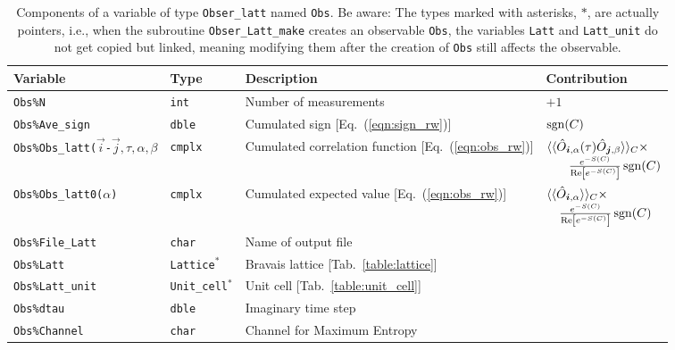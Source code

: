 \begin{table}[h!]
	\begin{center}
	\begin{tabular}{@{} p{}  l  p{} p{} @{}}\toprule
		Variable  &  Type      &  Description &  Contribution \\\midrule
		\texttt{Obs\%N}                       &  \texttt{int}        &   Number of measurements &    $+1$\\
		\texttt{Obs\%Ave\_sign} &  \texttt{dble}  &    Cumulated sign [Eq.~(\ref{eqn:sign_rw})] & $\operatorname{sgn}(C)$  \\
		\texttt{Obs\%Obs\_latt($\vec{i}$-$\vec{j},\allowbreak\tau,\alpha,\beta$}        & \texttt{cmplx}      &    Cumulated correlation function [Eq.~(\ref{eqn:obs_rw})] & $ \begin{multlined}[t] \langle \langle \hat{O}_{\vec{i},\alpha} (\tau) \hat{O}_{\vec{j},\beta} \rangle \rangle_{C} \times\\[-0.5ex] \tfrac{e^{-S(C)}} {\Re \left[e^{-S(C)} \right]}  \sgn(C) \end{multlined}$  \\
		\texttt{Obs\%Obs\_latt0($\alpha$)}        & \texttt{cmplx}      &    Cumulated expected value [Eq.~(\ref{eqn:obs_rw})] &  $ \begin{multlined}[t] \langle \langle \hat{O}_{\vec{i},\alpha} \rangle \rangle_{C} \times\\[-0.5ex] \tfrac{e^{-S(C)}} {\Re \left[e^{-S(C)} \right]} \sgn(C) \end{multlined}$ \\
		\texttt{Obs\%File\_Latt}           &   \texttt{char}   &    Name of output file  &
		\\
		\texttt{Obs\%Latt} & \texttt{Lattice}$^*$ & Bravais lattice [Tab.~\ref{table:lattice}] & \\
		\texttt{Obs\%Latt\_unit} & \texttt{Unit\_cell}$^*$ & Unit cell [Tab.~\ref{table:unit_cell}] & \\
		\texttt{Obs\%dtau} & \texttt{dble} & Imaginary time step & \\
		\texttt{Obs\%Channel} & \texttt{char} & Channel for Maximum Entropy &
		\\\bottomrule
	\end{tabular}
	\caption{Components of a variable of type \texttt{Obser\_latt} named \texttt{Obs}.
	Be aware: The types marked with asterisks, $*$, are actually pointers, i.e., when the subroutine \texttt{Obser\_Latt\_make} creates an observable \texttt{Obs}, the variables \texttt{Latt} and \texttt{Latt\_unit} do not get copied but linked, meaning modifying them after the creation of \texttt{Obs} still affects the observable.}
	\label{table:Obser_latt}
\end{center}
\end{table}
